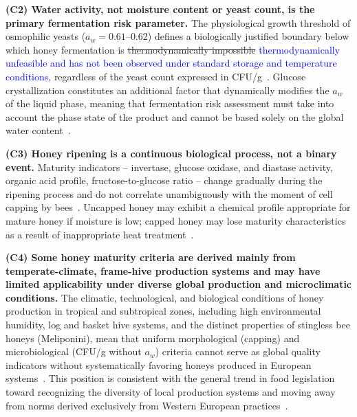 \textbf{(C2) Water activity, not moisture content or yeast count, is the primary fermentation risk parameter.}
The physiological growth threshold of osmophilic yeasts
($a_w = 0.61$--$0.62$) defines a biologically justified
boundary below which honey fermentation is \sout{thermodynamically
impossible} \textcolor{blue}{thermodynamically unfeasible and has not been
observed under standard storage and temperature conditions,}
regardless of the yeast count expressed in
CFU/g~\cite{waaw2006,ruegg1981}.
Glucose crystallization constitutes an additional factor that
dynamically modifies the $a_w$ of the liquid phase, meaning that
fermentation risk assessment must take into account the phase state
of the product and cannot be based solely on the global water
content~\cite{zamora2006,ijfans2019}.

\textbf{(C3) Honey ripening is a continuous biological process, not a binary event.}
Maturity indicators -- invertase, glucose oxidase, and diastase
activity, organic acid profile, fructose-to-glucose ratio --
change gradually during the ripening process and do not correlate
unambiguously with the moment of cell capping by
bees~\cite{zhang2021,sun2021}.
Uncapped honey may exhibit a chemical profile appropriate for
mature honey if moisture is low; capped honey may lose maturity
characteristics as a result of inappropriate heat
treatment~\cite{codex_stan12,guo2020,zhang2021}.

\textbf{(C4) Some honey maturity criteria are derived mainly from temperate-climate, frame-hive production systems and may have limited applicability under diverse global production and microclimatic conditions.}
The climatic, technological, and biological conditions of honey
production in tropical and subtropical zones, including high
environmental humidity, log and basket hive systems, and the
distinct properties of stingless bee honeys (Meliponini), mean
that uniform morphological (capping) and microbiological (CFU/g
without $a_w$) criteria cannot serve as global quality indicators
without systematically favoring honeys produced in European
systems~\cite{tadele2025,stinglessyeastbrazil2021,sciendo2012}.
This position is consistent with the general trend in food
legislation toward recognizing the diversity of local production
systems and moving away from norms derived exclusively from
Western European practices~\cite{phiri2022}.

